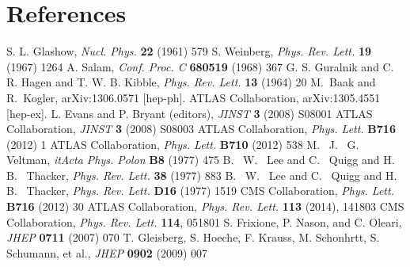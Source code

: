 \documentclass[a4paper]{jpconf}
\begin{document}
\section*{References}
\begin{thebibliography}{9}
 S. L. Glashow, \textit{Nucl. Phys.} \textbf{22} (1961) 579
 S. Weinberg, \textit{Phys. Rev. Lett.} \textbf{19} (1967) 1264
 A. Salam, \textit{Conf. Proc. C} \textbf{680519} (1968) 367
 G. S. Guralnik and C. R. Hagen and T. W. B. Kibble, \textit{Phys. Rev. Lett.} \textbf{13} (1964) 20
M.~Baak and R.~Kogler, arXiv:1306.0571 [hep-ph].
 ATLAS Collaboration, arXiv:1305.4551 [hep-ex].
 L. Evans and P. Bryant (editors), \textit{JINST} \textbf{3} (2008) S08001
 ATLAS Collaboration, \textit{JINST} \textbf{3} (2008) S08003
 ATLAS Collaboration, \textit{Phys. Lett.} \textbf{B716} (2012) 1
 ATLAS Collaboration, \textit{Phys. Lett.} {\bf B710} (2012) 538
 M.~ J.~ G.~ Veltman, \textit{itActa Phys. Polon} \textbf{B8} (1977) 475
 B.~ W.~ Lee and C.~ Quigg and H.~ B.~ Thacker, \textit{Phys. Rev. Lett.} \textbf{38} (1977) 883
 B.~ W.~ Lee and C.~ Quigg and H.~ B.~ Thacker, \textit{Phys. Rev. Lett.} \textbf{D16} (1977) 1519
 CMS Collaboration, \textit{Phys. Lett.} \textbf{B716} (2012) 30
 ATLAS Collaboration, \textit{Phys. Rev. Lett.} \textbf{113} (2014), 141803
 CMS Collaboration, \textit{Phys. Rev. Lett.} \textbf{114}, 051801
 S. Frixione, P. Nason, and C. Oleari, \textit{JHEP} \textbf{0711} (2007) 070
 T. Gleisberg, S. Hoeche, F. Krauss, M. Schonhrtt, S. Schumann, et al., \textit{JHEP} \textbf{0902} (2009) 007
\end{thebibliography}
\end{document}
